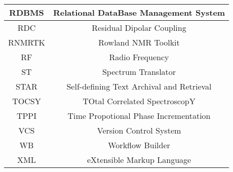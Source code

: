 \begin{center}
\begin{longtable}{ | c || c | }
    RDBMS   & Relational DataBase Management System     \\  \hline 
    RDC     & Residual Dipolar Coupling                 \\  \hline 
    RNMRTK  & Rowland NMR Toolkit                       \\  \hline 
    RF      & Radio Frequency                           \\  \hline 
    ST      & Spectrum Translator                       \\  \hline 
    STAR    & Self-defining Text Archival and Retrieval \\  \hline 
    TOCSY   & TOtal Correlated SpectroscopY             \\  \hline 
    TPPI    & Time Propotional Phase Incrementation     \\  \hline 
    VCS     & Version Control System                    \\  \hline
    WB      & Workflow Builder                          \\  \hline 
    XML     & eXtensible Markup Language                \\  \hline 
    \end{longtable}
    \label{acronyms}
\end{center}

